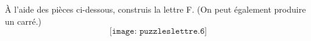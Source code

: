 \par \`A l'aide des pièces ci-dessous, construis la lettre F. (On peut également produire un carré.)
\[\texttt{[image: puzzleslettre.6]}\]